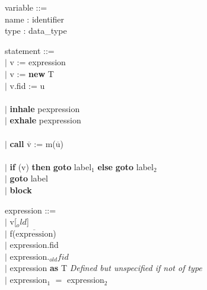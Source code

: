 \documentclass{paper}
\begin{document}
	\begin{tabbing}
 			variable ::= \\
 			\indent name : identifier \\
 			\indent type : data\_type  \\
	\end{tabbing}

	\begin{tabbing}
 			statement ::= \\
 			\indent $|$ v := expression \\
 			\indent $|$ v := \textbf{new} T\\ 
 			\indent $|$ v.fid := u \\
 			\\
 			\indent $|$ \textbf{inhale} pexpression \\
 			\indent $|$ \textbf{exhale} pexpression \\
 			\\
 			\indent $|$ \textbf{call} $\overline{\mathrm{v}}$ := m($\overline{\mathrm{u}}$) \\
 			\\

 			\indent $|$ \textbf{if} (v) \textbf{then} \textbf{goto} label$_1$ \textbf{else} \textbf{goto} label$_2$ \\
 			\indent $|$ \textbf{goto} label \\
 			\indent $|$ \textbf{block} \\
	\end{tabbing}
	
	\begin{tabbing}
 			expression ::= \\
 			\indent $|$ v[$_old$] \\
 			\indent $|$ f($\overline{\mathrm{expression}}$) \\
 			\indent $|$ expression.fid \\
 			\indent $|$ expression.$_{old}fid$ \\
 			\indent $|$ expression \textbf{as} T  \textit{\color{grey}\/\/Defined but unspecified if not of type}\\
 			\indent $|$ expression$_1$ $=$ expression$_2$ \\
	\end{tabbing}
\end{document}
